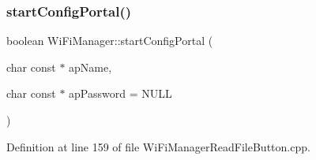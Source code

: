 \subsubsection{\texorpdfstring{start\+Config\+Portal()}{startConfigPortal()}\hspace{0.1cm}{\footnotesize\ttfamily [2/2]}}
{\footnotesize\ttfamily boolean Wi\+Fi\+Manager\+::start\+Config\+Portal (\begin{DoxyParamCaption}\item[{char const $\ast$}]{ap\+Name,  }\item[{char const $\ast$}]{ap\+Password = {\ttfamily NULL} }\end{DoxyParamCaption})}



Definition at line 159 of file Wi\+Fi\+Manager\+Read\+File\+Button.\+cpp.



